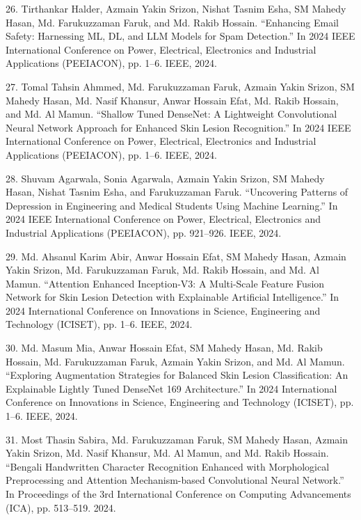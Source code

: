 \documentclass[a4paper,10pt]{article}
\newlength{\cvcolumngapwidth}
\newlength{\cvleftcolumnwidth}
\newlength{\cvrightcolumnwidth}
\newcommand{\cvdurationstyle}[1]{{\small\cvdurationfont\textcolor{cvdurationcolor}{#1}}}
\newlength{\cvafteritemskipamount}
\newlength{\cvparskip}
\newcommand{\cvitem}[2]{
    \begin{minipage}[t]{\cvleftcolumnwidth}
        \raggedleft #1
    \end{minipage}%
    \hspace{\cvcolumngapwidth}%
    \begin{minipage}[t]{\cvrightcolumnwidth}
        \setlength{\parskip}{\cvparskip} #2
    \end{minipage}

    \vspace{\cvafteritemskipamount}
}
\begin{document}
\cvitem{
    \cvdurationstyle{}
}{
26. Tirthankar Halder, Azmain Yakin Srizon, Nishat Tasnim Esha, SM Mahedy Hasan, Md. Farukuzzaman Faruk, and Md. Rakib Hossain. “Enhancing Email Safety: Harnessing ML, DL, and LLM Models for Spam Detection.” In 2024 IEEE International Conference on Power, Electrical, Electronics and Industrial Applications (PEEIACON), pp. 1–6. IEEE, 2024.
}

\cvitem{
    \cvdurationstyle{}
}{
27. Tomal Tahsin Ahmmed, Md. Farukuzzaman Faruk, Azmain Yakin Srizon, SM Mahedy Hasan, Md. Nasif Khansur, Anwar Hossain Efat, Md. Rakib Hossain, and Md. Al Mamun. “Shallow Tuned DenseNet: A Lightweight Convolutional Neural Network Approach for Enhanced Skin Lesion Recognition.” In 2024 IEEE International Conference on Power, Electrical, Electronics and Industrial Applications (PEEIACON), pp. 1–6. IEEE, 2024.
}

\cvitem{
    \cvdurationstyle{}
}{
28. Shuvam Agarwala, Sonia Agarwala, Azmain Yakin Srizon, SM Mahedy Hasan, Nishat Tasnim Esha, and Farukuzzaman Faruk. “Uncovering Patterns of Depression in Engineering and Medical Students Using Machine Learning.” In 2024 IEEE International Conference on Power, Electrical, Electronics and Industrial Applications (PEEIACON), pp. 921–926. IEEE, 2024.
}

\cvitem{
    \cvdurationstyle{}
}{
29. Md. Ahsanul Karim Abir, Anwar Hossain Efat, SM Mahedy Hasan, Azmain Yakin Srizon, Md. Farukuzzaman Faruk, Md. Rakib Hossain, and Md. Al Mamun. “Attention Enhanced Inception-V3: A Multi-Scale Feature Fusion Network for Skin Lesion Detection with Explainable Artificial Intelligence.” In 2024 International Conference on Innovations in Science, Engineering and Technology (ICISET), pp. 1–6. IEEE, 2024.
}

\cvitem{
    \cvdurationstyle{}
}{
30. Md. Masum Mia, Anwar Hossain Efat, SM Mahedy Hasan, Md. Rakib Hossain, Md. Farukuzzaman Faruk, Azmain Yakin Srizon, and Md. Al Mamun. “Exploring Augmentation Strategies for Balanced Skin Lesion Classification: An Explainable Lightly Tuned DenseNet 169 Architecture.” In 2024 International Conference on Innovations in Science, Engineering and Technology (ICISET), pp. 1–6. IEEE, 2024.
}

\cvitem{
    \cvdurationstyle{}
}{
31. Most Thasin Sabira, Md. Farukuzzaman Faruk, SM Mahedy Hasan, Azmain Yakin Srizon, Md. Nasif Khansur, Md. Al Mamun, and Md. Rakib Hossain. “Bengali Handwritten Character Recognition Enhanced with Morphological Preprocessing and Attention Mechanism-based Convolutional Neural Network.” In Proceedings of the 3rd International Conference on Computing Advancements (ICA), pp. 513–519. 2024.
}
\end{document}
